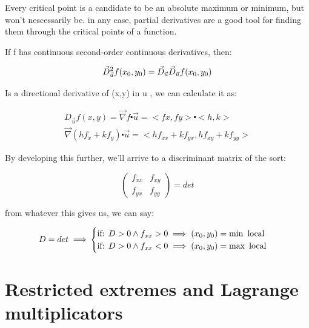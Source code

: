 \documentclass[11pt,fleqn]{book} %
\begin{document}
Every critical point is a candidate to be an absolute maximum or minimum, but won't nescessarily be. 
in any case, partial derivatives are a good tool for finding them through the critical points of a function.

If f has continuous second-order continuous derivatives, then:

\begin{equation}
    \vec{D}^2_{\vec{u}} f(x_0,y_0) = \vec{D}_{\vec{u}} \vec{D}_{\vec{u}} f(x_0,y_0)\\
\end{equation}

Is a directional derivative of (x,y) in u , we can calculate it as:

\begin{gather}
    D_{\vec{u}}f(x,y) =\vec{\nabla} f \centerdot \vec{u} = <fx, fy> \centerdot <h,k> \\
    \vec{\nabla}(h f_x+ k f_y) \centerdot \vec{u} = <h f_{xx} + k f_{yx}, h f_{xy} + k f_{yy}>
\end{gather}

By developing this further, we'll arrive to a discriminant matrix of the sort:

\begin{equation}
    \begin{pmatrix}
        f_{xx} & f_{xy} \\
        f_{yx} & f_{yy}
    \end{pmatrix} = det
\end{equation}

from whatever this gives us, we can say:

\begin{equation}
    D = det \implies \\
    \begin{cases}
    \text{if: } D > 0 \wedge  f_{xx} > 0 \implies (x_0 , y_0) = \min \text{ local} \\
    \text{if: } D > 0 \wedge  f_{xx} < 0 \implies (x_0 , y_0) = \max \text{ local} \\            
    
    \end{cases}
\end{equation}

\section{Restricted extremes and Lagrange multiplicators}
\end{document}
